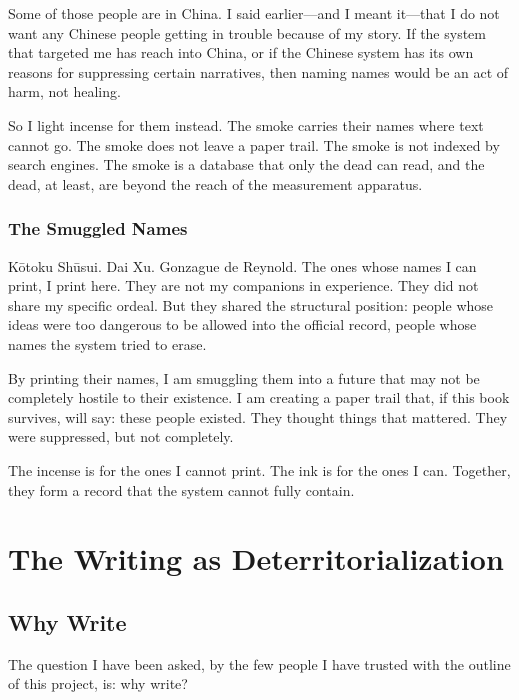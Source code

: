 \documentclass[11pt,openany]{book}
\begin{document}
Some of those people are in China. I said earlier---and I meant it---that I do not want any Chinese people getting in trouble because of my story. If the system that targeted me has reach into China, or if the Chinese system has its own reasons for suppressing certain narratives, then naming names would be an act of harm, not healing.

So I light incense for them instead. The smoke carries their names where text cannot go. The smoke does not leave a paper trail. The smoke is not indexed by search engines. The smoke is a database that only the dead can read, and the dead, at least, are beyond the reach of the measurement apparatus.

\section*{The Smuggled Names}

K\=otoku Sh\=usui. Dai Xu. Gonzague de Reynold. The ones whose names I can print, I print here. They are not my companions in experience. They did not share my specific ordeal. But they shared the structural position: people whose ideas were too dangerous to be allowed into the official record, people whose names the system tried to erase.

By printing their names, I am smuggling them into a future that may not be completely hostile to their existence. I am creating a paper trail that, if this book survives, will say: these people existed. They thought things that mattered. They were suppressed, but not completely.

The incense is for the ones I cannot print. The ink is for the ones I can. Together, they form a record that the system cannot fully contain.


\part{The Writing as Deterritorialization}

\chapter{Why Write}

The question I have been asked, by the few people I have trusted with the outline of this project, is: why write?
\end{document}
